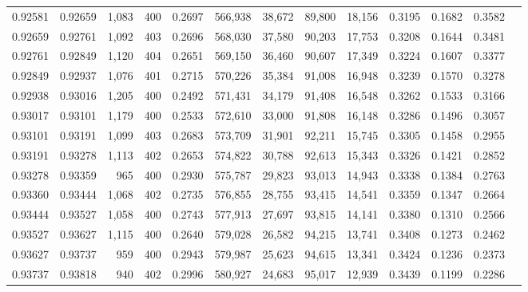 \begin{tabular}{rrrrrrrrrrrrr}
0.92581 & 0.92659 & 1,083 & 400 &                                     0.2697 & 566,938 &  38,672 &  89,800 &  18,156 & 0.3195 & 0.1682 & 0.3582 \\
0.92659 & 0.92761 & 1,092 & 403 &                                     0.2696 & 568,030 &  37,580 &  90,203 &  17,753 & 0.3208 & 0.1644 & 0.3481 \\
0.92761 & 0.92849 & 1,120 & 404 &                                     0.2651 & 569,150 &  36,460 &  90,607 &  17,349 & 0.3224 & 0.1607 & 0.3377 \\
0.92849 & 0.92937 & 1,076 & 401 &                                     0.2715 & 570,226 &  35,384 &  91,008 &  16,948 & 0.3239 & 0.1570 & 0.3278 \\
0.92938 & 0.93016 & 1,205 & 400 &                                     0.2492 & 571,431 &  34,179 &  91,408 &  16,548 & 0.3262 & 0.1533 & 0.3166 \\
0.93017 & 0.93101 & 1,179 & 400 &                                     0.2533 & 572,610 &  33,000 &  91,808 &  16,148 & 0.3286 & 0.1496 & 0.3057 \\
0.93101 & 0.93191 & 1,099 & 403 &                                     0.2683 & 573,709 &  31,901 &  92,211 &  15,745 & 0.3305 & 0.1458 & 0.2955 \\
0.93191 & 0.93278 & 1,113 & 402 &                                     0.2653 & 574,822 &  30,788 &  92,613 &  15,343 & 0.3326 & 0.1421 & 0.2852 \\
0.93278 & 0.93359 &   965 & 400 &                                     0.2930 & 575,787 &  29,823 &  93,013 &  14,943 & 0.3338 & 0.1384 & 0.2763 \\
0.93360 & 0.93444 & 1,068 & 402 &                                     0.2735 & 576,855 &  28,755 &  93,415 &  14,541 & 0.3359 & 0.1347 & 0.2664 \\
0.93444 & 0.93527 & 1,058 & 400 &                                     0.2743 & 577,913 &  27,697 &  93,815 &  14,141 & 0.3380 & 0.1310 & 0.2566 \\
0.93527 & 0.93627 & 1,115 & 400 &                                     0.2640 & 579,028 &  26,582 &  94,215 &  13,741 & 0.3408 & 0.1273 & 0.2462 \\
0.93627 & 0.93737 &   959 & 400 &                                     0.2943 & 579,987 &  25,623 &  94,615 &  13,341 & 0.3424 & 0.1236 & 0.2373 \\
0.93737 & 0.93818 &   940 & 402 &                                     0.2996 & 580,927 &  24,683 &  95,017 &  12,939 & 0.3439 & 0.1199 & 0.2286 \\

\end{tabular}
